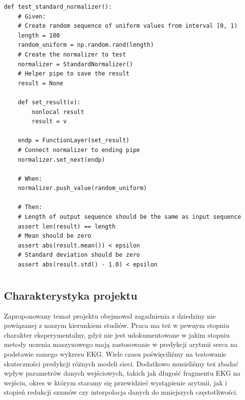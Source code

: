 \documentclass[polish,12pt]{aghthesis}
\begin{document}
\begin{lstlisting}[float=h!, caption={Przykładowy test normalizacji}]
def test_standard_normalizer():
    # Given:
    # Create random sequence of uniform values from interval [0, 1)
    length = 100
    random_uniform = np.random.rand(length)
    # Create the normalizer to test
    normalizer = StandardNormalizer()
    # Helper pipe to save the result
    result = None

    def set_result(v):
        nonlocal result
        result = v

    endp = FunctionLayer(set_result)
    # Connect normalizer to ending pipe
    normalizer.set_next(endp)

    # When:
    normalizer.push_value(random_uniform)

    # Then:
    # Length of output sequence should be the same as input sequence
    assert len(result) == length
    # Mean should be zero
    assert abs(result.mean()) < epsilon
    # Standard deviation should be zero
    assert abs(result.std() - 1.0) < epsilon
\end{lstlisting}

\section{\SectionTitleWorkOrganization}
\label{sec:organizacja-pracy}

\subsection{Charakterystyka projektu}

Zaproponowany temat projektu obejmował zagadnienia z dziedziny nie powiązanej z naszym kierunkiem studiów. Praca ma też w pewnym stopniu charakter eksperymentalny, gdyż nie jest udokumentowane w jakim stopniu metody uczenia maszynowego mają zastosowanie w predykcji arytmii serca na podstawie samego wykresu EKG. Wiele czasu poświęciliśmy na testowanie skuteczności predykcji różnych modeli sieci. Dodatkowo musieliśmy też zbadać wpływ parametrów danych wejściowych, takich jak długość fragmentu EKG na wejściu, okres w którym staramy się przewidzieć wystąpienie arytmii, jak i stopień redukcji szumów czy interpolacja danych do mniejszych częstotliwości. 
\end{document}
